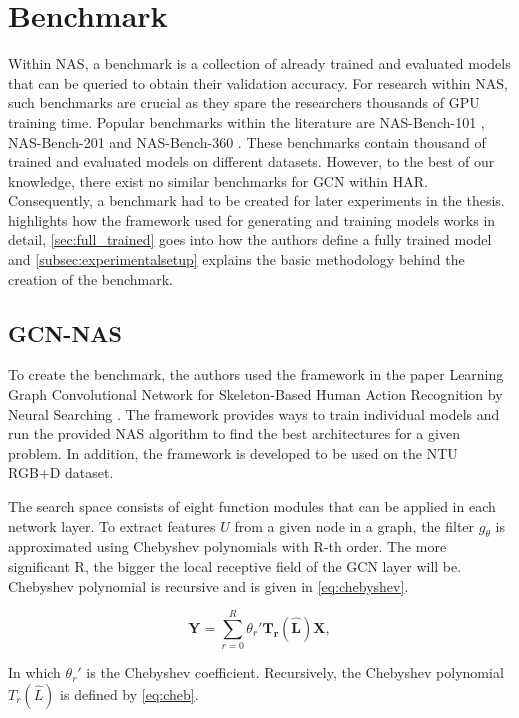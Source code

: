 \section{Benchmark}
Within NAS, a benchmark is a collection of already trained and evaluated models that can be queried to obtain their validation accuracy. For research within NAS, such benchmarks are crucial as they spare the researchers thousands of GPU training time. Popular benchmarks within the literature are NAS-Bench-101 \autocite{ying2019bench}, NAS-Bench-201 \autocite{dong2020bench} and NAS-Bench-360 \autocite{tu2021bench}. These benchmarks contain thousand of trained and evaluated models on different datasets. However, to the best of our knowledge, 
there exist no similar benchmarks for GCN within HAR. Consequently, a benchmark had to be created for later experiments in the thesis.  highlights how the framework used for generating and training models works in detail, \cref{sec:full_trained} goes into how the authors define a fully trained model and \cref{subsec:experimentalsetup} explains the basic methodology behind the creation of the benchmark.       

\subsection{GCN-NAS}\label{sec:gcn-nas}
To create the benchmark, the authors used the framework in the paper Learning Graph Convolutional Network for Skeleton-Based Human Action Recognition by Neural Searching \autocite{peng2020learning}. The framework provides ways to train individual models and run the provided NAS algorithm to find the best architectures for a given problem. In addition, the framework is developed to be used on the NTU RGB+D dataset.  

The search space consists of eight function modules that can be applied in each network layer. To extract features $U$ from a given node in a graph, the filter $g_{\theta}$ is approximated using Chebyshev polynomials with R-th order. The more significant R, the bigger the local receptive field of the GCN layer will be. Chebyshev polynomial is recursive and is given in \cref{eq:chebyshev}. 

\begin{equation}
    \bm{Y} = \sum^R_{r=0} \theta_r' \bm{T_r} (\bm{\hat{L}})\bm{X},
    \label{eq:chebyshev}
\end{equation}

In which $ \theta_r'$ is the Chebyshev coefficient. Recursively, the Chebyshev polynomial $T_r(\hat{L})$ is defined by \cref{eq:cheb}. 

